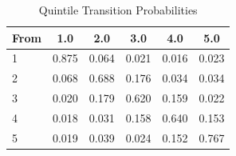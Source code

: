 \begin{table}
\caption{Quintile Transition Probabilities}
\label{tab:quintile_transitions}
\begin{tabular}{lccccc}
\toprule
From & 1.0 & 2.0 & 3.0 & 4.0 & 5.0 \\
\midrule
1 & 0.875 & 0.064 & 0.021 & 0.016 & 0.023 \\
2 & 0.068 & 0.688 & 0.176 & 0.034 & 0.034 \\
3 & 0.020 & 0.179 & 0.620 & 0.159 & 0.022 \\
4 & 0.018 & 0.031 & 0.158 & 0.640 & 0.153 \\
5 & 0.019 & 0.039 & 0.024 & 0.152 & 0.767 \\
\bottomrule
\end{tabular}
\end{table}
